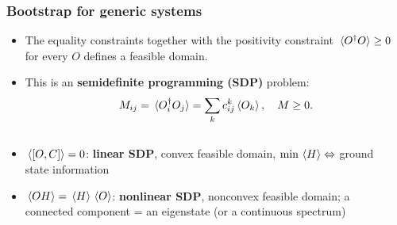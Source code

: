 \documentclass{beamer}
\newcommand{\concept}[1]{\textbf{#1}}
\begin{document}
\begin{frame}
\frametitle{Bootstrap for generic systems}

\begin{itemize}
    \item The equality constraints together with the positivity constraint $\expval*{O^\dagger O} \geq 0$
    for every $O$ defines a feasible domain.
    \item This is an \concept{semidefinite programming (SDP)} problem: 
    \begin{equation}
        M_{ij} = \expval*{O_i^\dagger O_j} = \sum_k c^k_{ij} \expval*{O_k}, \quad M \geq 0.
    \end{equation} 
\end{itemize} 

\begin{columns}
    
\begin{column}{0.5\textwidth}
    \begin{itemize}
        \item $\expval*{\comm{O}{C}} = 0$: \concept{linear SDP}, convex feasible domain, 
        $\min \expval*{H} \Leftrightarrow$ ground state information
        \item $\expval*{OH} = \expval*{H} \expval*{O}$: \concept{nonlinear SDP}, nonconvex feasible domain; 
        a connected component = an eigenstate (or a continuous spectrum)
    \end{itemize}
\end{column}

\begin{column}{0.5\textwidth}
    \begin{center}
        
    \end{center}    
\end{column}

\end{columns}

\end{frame}
\end{document}
